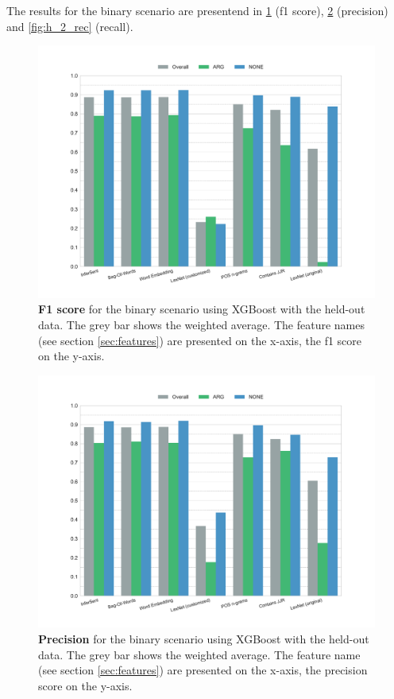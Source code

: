 \FloatBarrier

The results for the binary scenario are presentend in \ref{fig:h_2_f1} (f1 score), \ref{fig:h_2_prec} (precision) and \ref{fig:h_2_rec} (recall).

\begin{figure}[htbp]
         \caption{\textbf{F1 score} for the binary scenario using XGBoost with the held-out data. The grey bar shows the weighted average. The feature names (see section \ref{sec:features}) are presented on the x-axis, the f1 score on the y-axis.} 
    \label{fig:h_2_f1}
    \centering
	\includegraphics[width=0.9\linewidth]{images/heldout/h-f1-True}
    \end{figure}


\begin{figure}[htbp]
         \caption{\textbf{Precision} for the binary scenario using XGBoost with the held-out data. The grey bar shows the weighted average. The feature name (see section \ref{sec:features}) are presented on the x-axis, the precision score on the y-axis.} 
    \label{fig:h_2_prec}
    \centering
	\includegraphics[width=0.9\linewidth]{images/heldout/h-precision-True}
    \end{figure}
    
